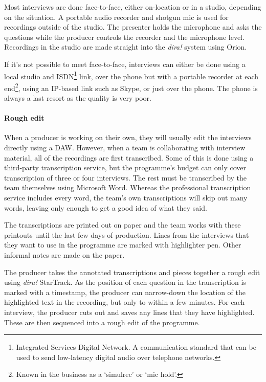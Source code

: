 Most interviews are done face-to-face, either on-location or in a studio, depending on the situation. A portable audio
recorder and shotgun mic is used for recordings outside of the studio. The presenter holds the microphone and asks the
questions while the producer controls the recorder and the microphone level. Recordings in the studio are made straight
into the \textit{dira!} system using Orion.

If it's not possible to meet face-to-face, interviews can either be done using a local studio and
ISDN\footnote{Integrated Services Digital Network.  A communication standard that can be used to send low-latency
  digital audio over telephone networks.} link, over the phone but with a portable recorder at each end\footnote{Known
  in the business as a `simulrec' or `mic hold'.}, using an IP-based link such as Skype, or just over the phone. The
phone is always a last resort as the quality is very poor.

\paragraph{Rough edit}
When a producer is working on their own, they will usually edit the interviews directly using a DAW. However, when a
team is collaborating with interview material, all of the recordings are first transcribed. Some of this is done using
a third-party transcription service, but the programme's budget can only cover transcription of three or four
interviews. The rest must be transcribed by the team themselves using Microsoft Word. Whereas the professional
transcription service includes every word, the team's own transcriptions will skip out many words, leaving only enough
to get a good idea of what they said.

The transcriptions are printed out on paper and the team works with these printouts until the last few days of
production. Lines from the interviews that they want to use in the programme are marked with highlighter pen. Other
informal notes are made on the paper.

The producer takes the annotated transcriptions and pieces together a rough edit using \textit{dira!} StarTrack. As the
position of each question in the transcription is marked with a timestamp, the producer can narrow-down the location of
the highlighted text in the recording, but only to within a few minutes. For each interview, the producer cuts out and
saves any lines that they have highlighted. These are then sequenced into a rough edit of the programme.

